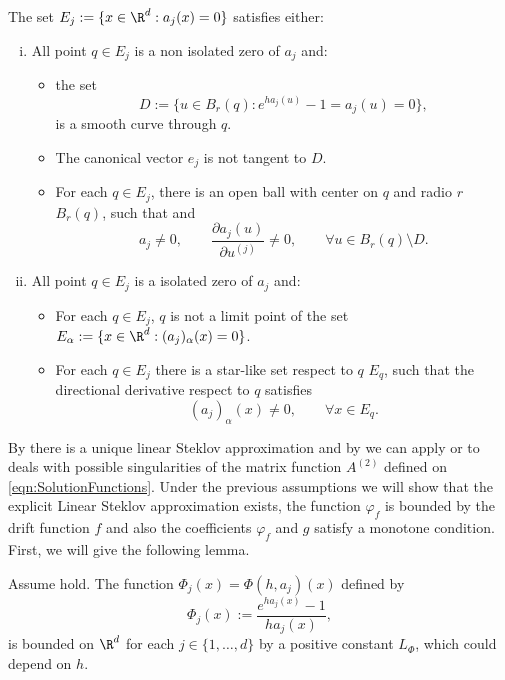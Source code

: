 \begin{hypothesis} \label{ass:HypThmSingularities}
	The set $E_j:=\{x\in \R^{d}: a_j(x)=0\}$ satisfies either:
	\begin{enumerate}[(i)]
		\item
			All point $q \in E_j$ is a non isolated zero of $a_j$ and:
			\begin{itemize}
				\item the set 
					$$
						D:=\{u \in B_r(q): e^{ha_j(u)}-1=a_j(u)= 0\},
					$$ 
					is a smooth curve through $q$. 
				\item
					The canonical vector $e_j$ is not
					tangent to $D$.
				\item
					For each $q \in E_j$, there is an open ball with center
					on $q$ and radio $r$ $B_r(q)$, such that  
					and
					$$
						a_j\neq 0, \qquad
						\frac{\partial a_j(u)}{\partial u^{(j)}} \neq 0 ,\qquad 
						\forall u \in B_r(q)
						\setminus D.
					$$
			\end{itemize}	
		\item
			All point $q \in E_j$ is a isolated zero of $a_j$ and:
			\begin{itemize}
				\item
					For each $q\in E_j$,  $q$ is not a limit point of the set 
					$E_{\alpha}:=\{x \in \R^d: (a_j)_\alpha(x)=0\}$.
				\item
					For each $q \in E_j$ there is a star-like set respect to $q$ $E_q$, such that
					the directional derivative respect to $q$ satisfies
					$$
						 (a_j)_\alpha(x) \neq 0, \qquad \forall x\in E_q.
					$$
			\end{itemize}		
	\end{enumerate}	
\end{hypothesis}
%
By  there is a unique linear Steklov approximation and by 
we can apply   or  to deals with possible singularities of the matrix function 
$A^{(2)}$ defined on \eqref{eqn:SolutionFunctions}. Under the previous  assumptions 
we will show that the explicit Linear  Steklov approximation 
exists, the function $\varphi_f$ is bounded by the drift function $f$ and also the 
coefficients $\varphi_f$  and $g$  satisfy a monotone condition. First, we will give the following lemma.
\begin{lem}\label{l1}
	Assume  hold. 
	The function $\Phi_j(x)=\Phi(h, a_j)(x)$ 
	defined by
	\begin{equation}\label{eqn:ExpBound}
		\Phi_j(x):=\frac{e^{ha_j(x)}-1}{ha_j(x)},
	\end{equation}
	is bounded  on $\R^d$ for each $j\in \{ 1,\dots, d\}$
	by a positive constant $L_{\Phi}$, which could depend on $h$.
\end{lem}

